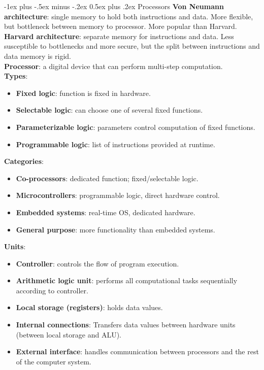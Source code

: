 \documentclass[10pt,landscape]{article}
\makeatletter
\renewcommand{\section}{\@startsection{section}{1}{0mm}%
                                {-1ex plus -.5ex minus -.2ex}%
                                {0.5ex plus .2ex}%
                                {\normalfont\small\bfseries}}
\makeatother
\begin{document}
\begin{multicols}{3}
\section{Processors}
\textbf{Von Neumann architecture}: single memory to hold both instructions and data. More flexible, but bottleneck between memory to processor. More popular than Harvard.\\
\textbf{Harvard architecture}: separate memory for instructions and data. Less susceptible to bottlenecks and more secure, but the split between instructions and data memory is rigid.\\
\textbf{Processor}: a digital device that can perform multi-step computation.\\
\textbf{Types}:
\begin{itemize}
\item \textbf{Fixed logic}: function is fixed in hardware.
\item \textbf{Selectable logic}: can choose one of several fixed functions.
\item \textbf{Parameterizable logic}: parameters control computation of fixed functions.
\item \textbf{Programmable logic}: list of instructions provided at runtime.
\end{itemize}
\textbf{Categories}:
\begin{itemize}
\item\textbf{Co-processors}: dedicated function; fixed/selectable logic.
\item\textbf{Microcontrollers}: programmable logic, direct hardware control.
\item\textbf{Embedded systems}: real-time OS, dedicated hardware.
\item\textbf{General purpose}: more functionality than embedded systems.
\end{itemize}
\textbf{Units}:
\begin{itemize}
\item\textbf{Controller}: controls the flow of program execution.
\item\textbf{Arithmetic logic unit}: performs all computational tasks sequentially according to controller.
\item\textbf{Local storage (registers)}: holds data values.
\item\textbf{Internal connections}: Transfers data values between hardware units (between local storage and ALU).
\item\textbf{External interface}: handles communication between processors and the rest of the computer system.
\end{itemize}

\end{multicols}
\end{document}

